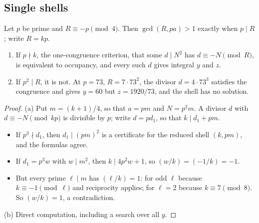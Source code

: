 \subsection{Single shells}\label{ssec:singleshells}

\begin{proposition}\label{prop:noncoprime}
Let $p$ be prime and $R\equiv-p\pmod4$. Then $\gcd(R,pa)>1$ exactly when $p\mid R$; write $R=kp$.
\begin{enumerate}[label=(\alph*)]
\item If $p\nmid k$, the one-congruence criterion, that some $d\mid N^2$ has $d\equiv-N\pmod R$, is equivalent to occupancy, and every such $d$ gives integral $y$ and $z$.
\item If $p^2\mid R$, it is not. At $p=73$, $R=7\cdot73^2$, the divisor $d=4\cdot73^3$ satisfies the congruence and gives $y=60$ but $z=1920/73$, and the shell has no solution.
\end{enumerate}
\end{proposition}
\begin{proof}
(a) Put $m=(k+1)/4$, so that $a=pm$ and $N=p^2m$. A divisor $d$ with $d\equiv-N\pmod{kp}$ is divisible by $p$; write $d=pd_1$, so that $k\mid d_1+pm$.
\begin{itemize}
\item If $p^3\nmid d_1$, then $d_1\mid(pm)^2$ is a certificate for the reduced shell $(k,pm)$, and the formulas agree.
\item If $d_1=p^3w$ with $w\mid m^2$, then $k\mid4p^2w+1$, so $(w/k)=(-1/k)=-1$.
\item But every prime $\ell\mid m$ has $(\ell/k)=1$: for odd $\ell$ because $k\equiv-1\pmod\ell$ and reciprocity applies; for $\ell=2$ because $k\equiv7\pmod8$. So $(w/k)=1$, a contradiction.
\end{itemize}
(b) Direct computation, including a search over all $y$.
\end{proof}

